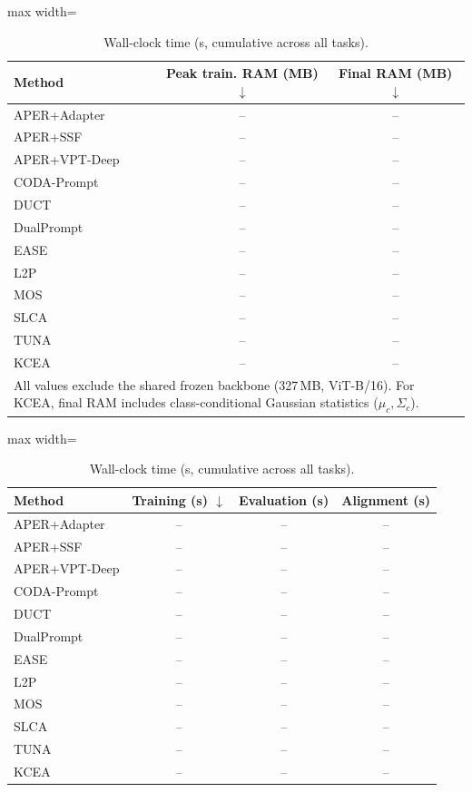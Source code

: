 \begin{table}[!t]
\begin{subtable}{\textwidth}
  \centering
  \caption{Memory cost (MB).}
  \label{tab:cost-memory}
  \renewcommand{\arraystretch}{0.95}
\begin{adjustbox}{max width=\textwidth}
\footnotesize
\begin{tabular}{l c c}
\toprule
Method & \textbf{Peak train. RAM (MB)} $\downarrow$ & \textbf{Final RAM (MB)} $\downarrow$ \\
\midrule
APER+Adapter & -- & -- \\
APER+SSF & -- & -- \\
APER+VPT-Deep & -- & -- \\
CODA-Prompt & -- & -- \\
DUCT & -- & -- \\
DualPrompt & -- & -- \\
EASE & -- & -- \\
L2P & -- & -- \\
MOS & -- & -- \\
SLCA & -- & -- \\
TUNA & -- & -- \\
\midrule
KCEA & -- & -- \\
\multicolumn{3}{l}{\scriptsize All values exclude the shared frozen backbone (327\,MB, ViT-B/16). For KCEA, final RAM includes class-conditional Gaussian statistics ($\mu_c, \Sigma_c$).} \\
\bottomrule
\end{tabular}
\end{adjustbox}
\end{subtable}

\vspace{0.6em}

\begin{subtable}{\textwidth}
  \centering
  \caption{Wall-clock time (s, cumulative across all tasks).}
  \label{tab:cost-time}
  \renewcommand{\arraystretch}{0.95}
\begin{adjustbox}{max width=\textwidth}
\footnotesize
\begin{tabular}{l c c c}
\toprule
Method & \textbf{Training (s)} $\downarrow$ & \textbf{Evaluation (s)} & \textbf{Alignment (s)} \\
\midrule
APER+Adapter & -- & -- & -- \\
APER+SSF & -- & -- & -- \\
APER+VPT-Deep & -- & -- & -- \\
CODA-Prompt & -- & -- & -- \\
DUCT & -- & -- & -- \\
DualPrompt & -- & -- & -- \\
EASE & -- & -- & -- \\
L2P & -- & -- & -- \\
MOS & -- & -- & -- \\
SLCA & -- & -- & -- \\
TUNA & -- & -- & -- \\
\midrule
KCEA & -- & -- & -- \\
\bottomrule
\end{tabular}
\end{adjustbox}
\end{subtable}
\end{table}